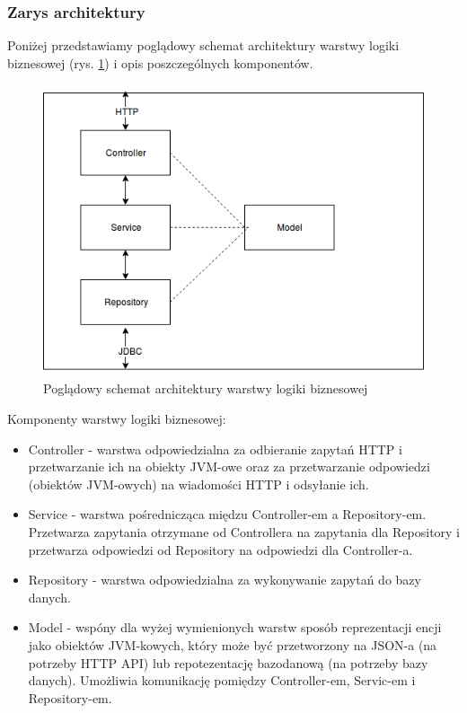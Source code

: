 \documentclass[polish,12pt]{aghthesis}
\begin{document}
\subsubsection{Zarys architektury}
Poniżej przedstawiamy poglądowy schemat architektury warstwy logiki biznesowej (rys. \ref{backedn-schema}) i opis poszczególnych komponentów.

\begin{figure}[H]
    \centering 
    \includegraphics[width=\textwidth]{backedn-schema}
    \caption{Poglądowy schemat architektury warstwy logiki biznesowej}
    \label{backedn-schema}
\end{figure}

Komponenty warstwy logiki biznesowej:
\begin{itemize}
    \item Controller - warstwa odpowiedzialna za odbieranie zapytań HTTP i przetwarzanie ich na obiekty JVM-owe oraz za przetwarzanie odpowiedzi (obiektów JVM-owych) na wiadomości HTTP i odsyłanie ich.
    \item Service - warstwa pośrednicząca międzu Controller-em a Repository-em. Przetwarza zapytania otrzymane od Controllera na zapytania dla Repository i przetwarza odpowiedzi od Repository na odpowiedzi dla Controller-a.
    \item Repository - warstwa odpowiedzialna za wykonywanie zapytań do bazy danych.
    \item Model - wspóny dla wyżej wymienionych warstw sposób reprezentacji encji jako obiektów JVM-kowych, który może być przetworzony na JSON-a (na potrzeby HTTP API) lub repotezentację bazodanową (na potrzeby bazy danych). Umożliwia komunikację pomiędzy Controller-em, Servic-em i Repository-em.
\end{itemize}
\end{document}
